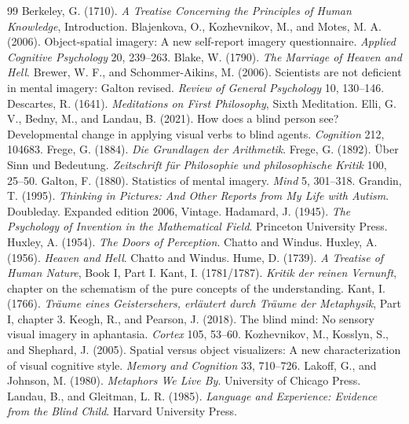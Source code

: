 \documentclass[11pt]{article}
\theoremstyle{remark}
\begin{document}
\begin{thebibliography}{99}\small
{} Berkeley, G. (1710). \emph{A Treatise Concerning the Principles of Human Knowledge}, Introduction.
 Blajenkova, O., Kozhevnikov, M., and Motes, M. A. (2006). Object-spatial imagery: A new self-report imagery questionnaire. \emph{Applied Cognitive Psychology} 20, 239--263.
 Blake, W. (1790). \emph{The Marriage of Heaven and Hell}.
 Brewer, W. F., and Schommer-Aikins, M. (2006). Scientists are not deficient in mental imagery: Galton revised. \emph{Review of General Psychology} 10, 130--146.
 Descartes, R. (1641). \emph{Meditations on First Philosophy}, Sixth Meditation.
 Elli, G. V., Bedny, M., and Landau, B. (2021). How does a blind person see? Developmental change in applying visual verbs to blind agents. \emph{Cognition} 212, 104683.
 Frege, G. (1884). \emph{Die Grundlagen der Arithmetik}.
 Frege, G. (1892). \"Uber Sinn und Bedeutung. \emph{Zeitschrift f\"ur Philosophie und philosophische Kritik} 100, 25--50.
 Galton, F. (1880). Statistics of mental imagery. \emph{Mind} 5, 301--318.
 Grandin, T. (1995). \emph{Thinking in Pictures: And Other Reports from My Life with Autism}. Doubleday. Expanded edition 2006, Vintage.
 Hadamard, J. (1945). \emph{The Psychology of Invention in the Mathematical Field}. Princeton University Press.
 Huxley, A. (1954). \emph{The Doors of Perception}. Chatto and Windus.
 Huxley, A. (1956). \emph{Heaven and Hell}. Chatto and Windus.
 Hume, D. (1739). \emph{A Treatise of Human Nature}, Book I, Part I.
 Kant, I. (1781/1787). \emph{Kritik der reinen Vernunft}, chapter on the schematism of the pure concepts of the understanding.
 Kant, I. (1766). \emph{Tr\"aume eines Geistersehers, erl\"autert durch Tr\"aume der Metaphysik}, Part I, chapter 3.
 Keogh, R., and Pearson, J. (2018). The blind mind: No sensory visual imagery in aphantasia. \emph{Cortex} 105, 53--60.
 Kozhevnikov, M., Kosslyn, S., and Shephard, J. (2005). Spatial versus object visualizers: A new characterization of visual cognitive style. \emph{Memory and Cognition} 33, 710--726.
 Lakoff, G., and Johnson, M. (1980). \emph{Metaphors We Live By}. University of Chicago Press.
 Landau, B., and Gleitman, L. R. (1985). \emph{Language and Experience: Evidence from the Blind Child}. Harvard University Press.

\end{thebibliography}
\end{document}

